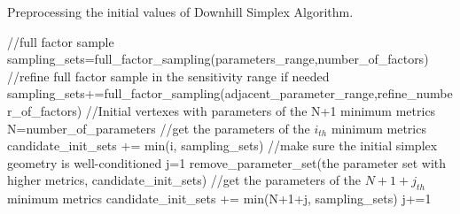 \documentclass[gmd, manuscript]{copernicus}
\begin{document}




\begin{algorithm}[htb]
\caption{Preprocessing the initial values of Downhill Simplex Algorithm.} 
\label{alg:sequential-operation}
\begin{algorithmic}
\STATE //full factor sample 
\STATE sampling\_sets=full\_factor\_sampling(parameters\_range,number\_of\_factors) 
\STATE //refine full factor sample in the sensitivity range if needed
\STATE sampling\_sets+=full\_factor\_sampling(adjacent\_parameter\_range,refine\_number\_of\_factors)
\ENDIF
\STATE
\STATE //Initial vertexes with parameters of the N+1 minimum metrics
\STATE N=number\_of\_parameters 
\STATE //get the parameters of the $i_{th}$ minimum metrics
\STATE candidate\_init\_sets += min(i, sampling\_sets) 
\ENDFOR
\STATE
\STATE //make sure the initial simplex geometry is well-conditioned
\STATE j=1
\STATE remove\_parameter\_set(the parameter set with higher metrics, candidate\_init\_sets)
\STATE //get the parameters of the $N+1+j_{th}$ minimum metrics
\STATE candidate\_init\_sets += min(N+1+j, sampling\_sets)
\STATE j+=1
\ENDWHILE
\end{algorithmic}
\end{algorithm}

\end{document}
